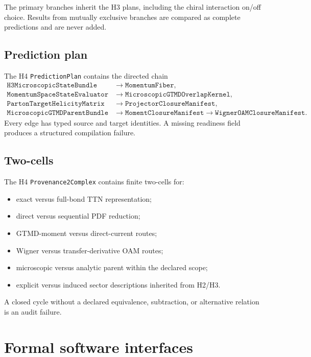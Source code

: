\documentclass[11pt]{article}
\newcommand{\PredictionPlan}{\texttt{PredictionPlan}}
\newcommand{\StateBundle}{\texttt{H3MicroscopicStateBundle}}
\newcommand{\MomentumFiber}{\texttt{MomentumFiber}}
\newcommand{\StateEvaluator}{\texttt{MomentumSpaceStateEvaluator}}
\newcommand{\OverlapKernel}{\texttt{MicroscopicGTMDOverlapKernel}}
\newcommand{\HelicityMatrix}{\texttt{PartonTargetHelicityMatrix}}
\newcommand{\ProjectorManifest}{\texttt{ProjectorClosureManifest}}
\newcommand{\MomentManifest}{\texttt{MomentClosureManifest}}
\newcommand{\WignerManifest}{\texttt{WignerOAMClosureManifest}}
\newcommand{\ParentBundle}{\texttt{MicroscopicGTMDParentBundle}}
\newcommand{\ProvComplex}{\texttt{Provenance2Complex}}
\begin{document}
The primary branches inherit the H3 plans, including the chiral interaction
on/off choice.  Results from mutually exclusive branches are compared as
complete predictions and are never added.

\subsection{Prediction plan}

The H4 \PredictionPlan{} contains the directed chain
\begin{equation}
\begin{aligned}
 \StateBundle&\longrightarrow\MomentumFiber,
 \\
 \StateEvaluator&\longrightarrow\OverlapKernel,
 \\
 \HelicityMatrix&\longrightarrow\ProjectorManifest,
 \\
 \ParentBundle&\longrightarrow\MomentManifest
 \longrightarrow\WignerManifest.
\end{aligned}
\end{equation}
Every edge has typed source and target identities.  A missing readiness field
produces a structured compilation failure.

\subsection{Two-cells}

The H4 \ProvComplex{} contains finite two-cells for:
\begin{itemize}
\item exact versus full-bond TTN representation;
\item direct versus sequential PDF reduction;
\item GTMD-moment versus direct-current routes;
\item Wigner versus transfer-derivative OAM routes;
\item microscopic versus analytic parent within the declared scope;
\item explicit versus induced sector descriptions inherited from H2/H3.
\end{itemize}
A closed cycle without a declared equivalence, subtraction, or alternative
relation is an audit failure.

\section{Formal software interfaces}
\label{sec:software}
\end{document}
